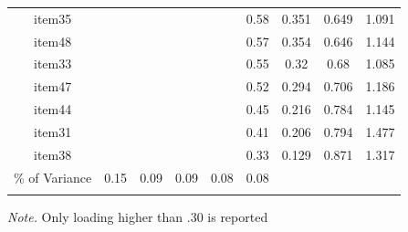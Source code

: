 \begin{appendix}
\begin{table}[h]
\begin{center}
\begin{threeparttable}
{\begin{tabular}{ccccccccc}
item35 &  &  &  &  & 0.58 & 0.351 & 0.649 & 1.091\\
item48 &  &  &  &  & 0.57 & 0.354 & 0.646 & 1.144\\
item33 &  &  &  &  & 0.55 & 0.32 & 0.68 & 1.085\\
item47 &  &  &  &  & 0.52 & 0.294 & 0.706 & 1.186\\
item44 &  &  &  &  & 0.45 & 0.216 & 0.784 & 1.145\\
item31 &  &  &  &  & 0.41 & 0.206 & 0.794 & 1.477\\
item38 &  &  &  &  & 0.33 & 0.129 & 0.871 & 1.317\\
\% of Variance & 0.15 & 0.09 & 0.09 & 0.08 & 0.08 &  &  & \\
\bottomrule
\addlinespace
\end{tabular}

}

\begin{tablenotes}[para]
\normalsize{\textit{Note.} Only loading higher than .30 is reported}
\end{tablenotes}

\end{threeparttable}
\end{center}

\end{table}


\end{appendix}
